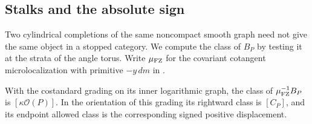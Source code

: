 \subsection{Stalks and the absolute sign}
Two cylindrical completions of the same noncompact smooth graph need not give the same object in a stopped category. We compute the class of $B_P$ by testing it at the strata of the angle torus. Write $\mu_{\rm FZ}$ for the covariant cotangent microlocalization with primitive $-y\,dm$ in \cite[Theorem~5.1]{FZ}.

\begin{lemma}\label{lem:stalkprobe}
With the costandard grading on its inner logarithmic graph, the class of $\mu_{\rm FZ}^{-1}B_P$ is $[\kappa\mathcal O(P)]$. In the orientation of this grading its rightward class is $[C_P]$, and its endpoint allowed class is the corresponding signed positive displacement.
\end{lemma}

